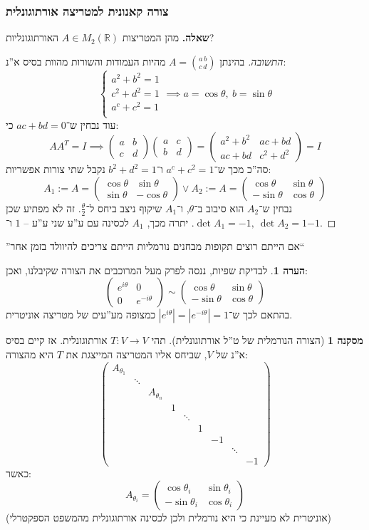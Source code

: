\documentclass[a4paper]{article}
\newcommand\R     {\mathbb{R}}
\newcommand\ta    {\theta}
\newcommand\co        {\colon}
\newcommand\pms[1]    {\begin{pmatrix}
		#1
\end{pmatrix}}
\newcommand\sof[1]    {\left | #1 \right |}
\theoremstyle{definition}
\newtheorem{Remark}{\color{mycyan}הערה}
\newtheorem{Collary}{\color{mymagenta}מסקנה}
\newcommand\rmark [1] {\begin{Remark}#1\end{Remark}}
\begin{document}
	\subsubsection{צורה קאנונית למטריצה אורתוגונלית}
	\textbf{שאלה. }מהן המטריצות $A \in M_2(\R)$ האורתוגונליות? \begin{proof}[התשובה]
		בהינתן $A = \binom{a\, b}{c\, d}$ מהיות העמודות והשורות מהוות בסיס א''נ:
		\[ \begin{cases}
			a^2 + b^2 = 1 \\
			c^2 + d^2 = 1 \\
			a^c + c^2 = 1 \\
		\end{cases} \implies a = \cos\ta, \ b = \sin\ta \]
		עוד נבחין ש־$ac + bd = 0$ כי: 
		\[ AA^T = I \implies \pms{a & b \\ c & d}\pms{a & c \\ b & d} = \pms{a^2 + b^2 & ac + bd \\ ac + bd & c^2 + d^2} = I \]
		סה''כ מכך ש־$a^c + c^2 = 1$ ו־$b^2 + d^2 = 1$ נקבל שתי צורות אפשריות: 
		\[ A_1:= A = \pms{\cos\ta & \sin\ta \\ \sin\ta & -\cos\ta} \lor A_2:= A = \pms{\cos\ta&\sin\ta \\ -\sin\ta & \cos\ta} \]
		נבחין ש־$A_2$ הוא סיבוב ב־$\ta$, ו־$A_1$ שיקוף ניצב ביחס ל־$\frac{\ta}{2}$. זה לא מפתיע שכן $\det A_1 = -1, \ \det A_2 = 1$. יתרה מכך, $A_1$ לכסינה עם ע''ע שני ע''ע – $1$ ו־$-1$. 
	\end{proof}
	''אם הייתם רוצים תקופות מבחנים נורמליות הייתם צריכים להיוולד בזמן אחר``
	
	\rmark{לבדיקת שפיות, ננסה לפרק מעל המרוכבים את הצורה שקיבלנו, ואכן: 
	\[ \pms{e^{i\ta} & 0 \\ 0 & e^{-i\ta}} \sim \pms{\cos \ta & \sin\ta \\ -\sin\ta & \cos\ta} \]
	בהתאם לכך ש־$\sof{e^{i\ta}} = \sof{e^{-i\ta}} = 1$ כמצופה מע''עים של מטריצה אוניטרית. }
	
	\begin{Collary}[הצורה הנורמלית של ט''ל אורתוגונלית]
		תהי $T \co V \to V$ אורתוגונלית. אז קיים בסיס א''נ של $V$, שביחס אליו המטריצה המייצגת את $T$ היא מהצורה: 
		\[ \pms{A_{\ta_1} \\ &\ddots \\ &&A_{\ta_n} \\ &&& 1 \\ &&&&\ddots \\ &&&&&1 \\ &&&&&&-1 \\ &&&&&&& \ddots \\ &&&&&&&&-1} \]
		כאשר: 
		\[ A_{\ta_i} = \pms{\cos \ta_i & \sin \ta_i \\ -\sin \ta_i & \cos \ta_i} \]
		(אוניטרית לא מעיינת כי היא נורמלית ולכן לכסינה אורתוגונלית מהמשפט הספקטרלי)
	\end{Collary}
	
\end{document}

